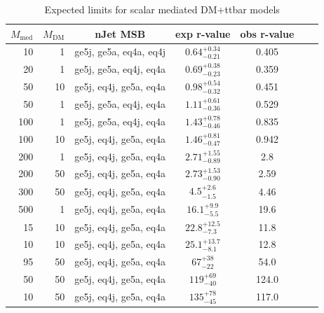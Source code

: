 \begin{table}
  \centering
  \begin{tabular}{rrccccc}
    \hline\hline
    $M_{\text{med}}$ & $M_{\text{DM}}$ & nJet MSB & exp r-value & obs r-value \\
    \hline
       10 &   1 & ge5j, ge5a, eq4a, eq4j & $0.64_{-0.21}^{+0.34}$ & 0.405 \\
       20 &   1 & ge5j, ge5a, eq4j, eq4a & $0.69_{-0.23}^{+0.38}$ & 0.359 \\
       50 &  10 & ge5j, eq4j, ge5a, eq4a & $0.98_{-0.32}^{+0.54}$ & 0.451 \\
       50 &   1 & ge5j, ge5a, eq4j, eq4a & $1.11_{-0.36}^{+0.61}$ & 0.529 \\
      100 &   1 & ge5j, ge5a, eq4j, eq4a & $1.43_{-0.46}^{+0.78}$ & 0.835 \\
      100 &  10 & ge5j, eq4j, ge5a, eq4a & $1.46_{-0.47}^{+0.81}$ & 0.942 \\
      200 &   1 & ge5j, eq4j, ge5a, eq4a & $2.71_{-0.89}^{+1.55}$ & 2.8 \\
      200 &  50 & ge5j, eq4j, ge5a, eq4a & $2.73_{-0.90}^{+1.53}$ & 2.59 \\
      300 &  50 & ge5j, eq4j, ge5a, eq4a & $4.5_{-1.5}^{+2.6}$    & 4.46 \\
      500 &   1 & ge5j, eq4j, ge5a, eq4a & $16.1_{-5.5}^{+9.9}$   & 19.6 \\
       15 &  10 & ge5j, eq4j, ge5a, eq4a & $22.8_{-7.3}^{+12.5}$  & 11.8 \\
       10 &  10 & ge5j, eq4j, ge5a, eq4a & $25.1_{-8.1}^{+13.7}$  & 12.8 \\
       95 &  50 & ge5j, eq4j, ge5a, eq4a & $67_{-22}^{+38}$       & 54.0 \\
       50 &  50 & ge5j, eq4j, ge5a, eq4a & $119_{-40}^{+69}$      & 124.0 \\
       10 &  50 & ge5j, eq4j, ge5a, eq4a & $135_{-45}^{+78}$      & 117.0 \\
    \hline\hline
  \end{tabular}
  \caption{Expected limits for scalar mediated DM+ttbar models}
  \label{tab:DMttS_limits}
\end{table}


